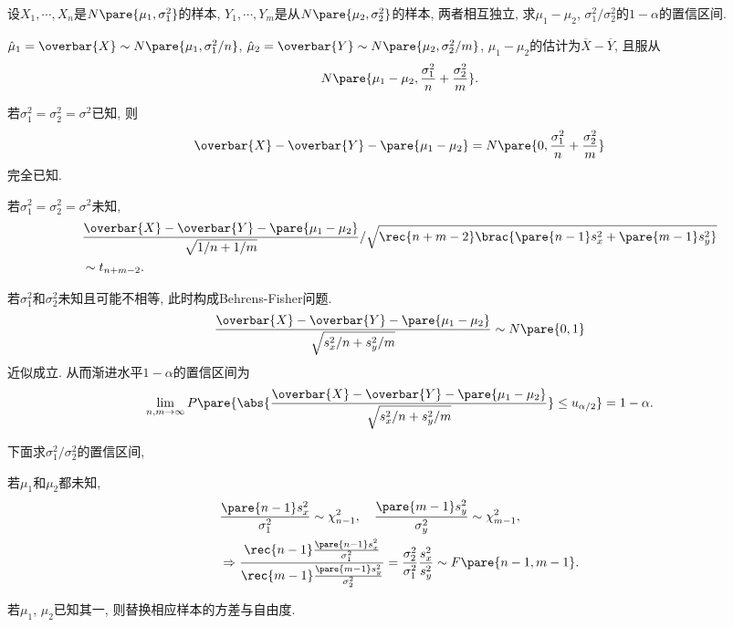 \documentclass[../Statistics.tex]{subfiles}
\begin{document}
\begin{sample}
    \begin{ex}
        设$X_1,\cdots,X_n$是$N\pare{\mu_1,\sigma_1^2}$的样本, $Y_1,\cdots,Y_m$是从$N\pare{\mu_2,\sigma_2^2}$的样本, 两者相互独立, 求$\mu_1 - \mu_2$, $\sigma_1^2 / \sigma_2^2$的$1-\alpha$的置信区间.
    \end{ex}
    \begin{solution}
        $\hat{\mu}_1 = \overbar{X} \sim N\pare{\mu_1, \sigma_1^2/n}$, $\hat\mu_2 = \overbar{Y} \sim N\pare{\mu_2,\sigma_2^2/m}$, $\mu_1 - \mu_2$的估计为$\overbar{X} - \overbar{Y}$, 且服从
        \[ N\pare{\mu_1-\mu_2, \frac{\sigma_1^2}{n} + \frac{\sigma_2^2}{m}}. \]
        \begin{cenum}
            \item 若$\sigma_1^2 = \sigma_2^2 = \sigma^2$已知, 则
            \[ \overbar{X} - \overbar{Y} - \pare{\mu_1 - \mu_2} = N\pare{0, \frac{\sigma_1^2}{n} + \frac{\sigma_2^2}{m}} \]
            完全已知.
            \item 若$\sigma_1^2 = \sigma_2^2 = \sigma^2$未知,
            \begin{align*}
                & \frac{\overbar{X} - \overbar{Y} - \pare{\mu_1 - \mu_2}}{\sqrt{1/n+1/m}}/\sqrt{\rec{n+m-2}\brac{\pare{n-1}s_x^2 + \pare{m-1}s_y^2}} \\ &\sim t_{n+m-2}. 
            \end{align*}
            \item 若$\sigma_1^2$和$\sigma_2^2$未知且可能不相等, 此时构成Behrens-Fisher问题.
            \[ \frac{\overbar{X} - \overbar{Y} - \pare{\mu_1 - \mu_2}}{\sqrt{s_x^2/n + s_y^2/m}} \sim N\pare{0,1} \]
            近似成立. 从而渐进水平$1-\alpha$的置信区间为
            \[ \lim_{n,m\rightarrow\infty} P\pare{\abs{\frac{\overbar{X} - \overbar{Y} - \pare{\mu_1 - \mu_2}}{\sqrt{s_x^2/n + s_y^2/m}}} \le u_{\alpha/2}} = 1-\alpha. \]
        \end{cenum}
        下面求$\sigma_1^2/\sigma_2^2$的置信区间,
        \begin{cenum}
            \item 若$\mu_1$和$\mu_2$都未知,
            \begin{align*}
                & \frac{\pare{n-1}s_x^2}{\sigma_1^2} \sim \chi_{n-1}^2,\quad \frac{\pare{m-1}s_y^2}{\sigma_y^2} \sim \chi_{m-1}^2, \\
                & \Rightarrow \frac{\rec{n-1}\frac{\pare{n-1}s_x^2}{\sigma_1^2}}{\rec{m-1}\frac{\pare{m-1}s_y^2}{\sigma_2^2}} = \frac{\sigma_2^2}{\sigma_1^2} \frac{s_x^2}{s_y^2} \sim F\pare{n-1,m-1}.
            \end{align*}
            \item 若$\mu_1$, $\mu_2$已知其一, 则替换相应样本的方差与自由度. \qedhere
        \end{cenum}
    \end{solution}
\end{sample}
\end{document}
